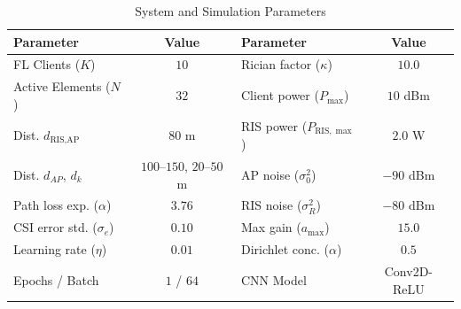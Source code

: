 \begin{table}[t]
\centering
\caption{System and Simulation Parameters}
\label{tab:sim_parameters}
\scriptsize
\setlength{\tabcolsep}{1.8pt}
\begin{tabular}{lc|lc}
\toprule
\textbf{Parameter} & \textbf{Value} & \textbf{Parameter} & \textbf{Value} \\
\midrule
FL Clients ($K$) & $10$ & Rician factor ($\kappa$) & $10.0$ \\
Active Elements ($N$) & $32$ & Client power ($P_{\max}$) & $10$ dBm \\
Dist. $d_{\text{RIS},\text{AP}}$ & $80$ m & RIS power ($P_{\text{RIS},\max}$) & $2.0$ W \\
Dist. $d_{AP}$, $d_{k}$ & $100$--$150$, $20$--$50$ m & AP noise ($\sigma_0^2$) & $-90$ dBm \\
Path loss exp. ($\alpha$) & $3.76$ & RIS noise ($\sigma_R^2$) & $-80$ dBm \\
CSI error std. ($\sigma_e$) & $0.10$ & Max gain ($a_{\max}$) & $15.0$ \\
Learning rate ($\eta$) & $0.01$ & Dirichlet conc. ($\alpha$) & $0.5$ \\
Epochs / Batch & $1$ / $64$ & CNN Model & Conv2D-ReLU \\
\bottomrule
\end{tabular}
\end{table}
